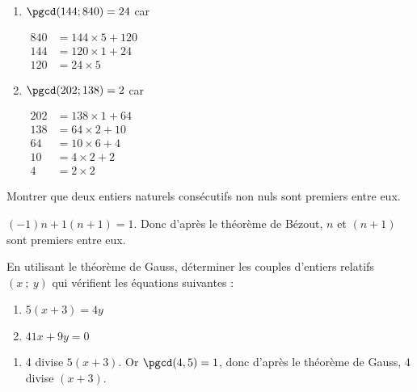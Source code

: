 \begin{colonne*exercice}
\begin{corrige}
\begin{enumerate}
  \item $\pgcd(144;840)=24$ car
    
    $\begin{aligned}
      840&=144\times5+120\\
      144&=120\times1+24\\
      120&=24\times5\end{aligned}$\medskip
    
    
    
  \item $\pgcd(202;138)=2$ car

    $\begin{aligned}
      202&=138\times1+64\\
      138&=64\times2+10\\
      64&=10\times6+4\\
      10&=4\times2+2\\
      4&=2\times2\end{aligned}$
    

    
  \end{enumerate}
\end{corrige}

\begin{exercice*}
  Montrer que deux entiers naturels consécutifs non nuls sont premiers
  entre eux.
\end{exercice*}
\begin{corrige}
  $(-1)n+1(n+1)=1$. Donc d'après le théorème de Bézout, $n$ et $(n+1)$
  sont premiers entre eux.
\end{corrige}

\begin{exercice*}
En utilisant le théorème de Gauss, déterminer les couples d’entiers
relatifs $(x\ ;\ y)$ qui vérifient les équations suivantes :

\vspace{-2mm}
\begin{multicols}{2}
\begin{enumerate}
\item $5(x+3)=4y$
\item $41x+9y=0$
\end{enumerate}
\end{multicols}
\end{exercice*}
\begin{corrige}
  \begin{enumerate}
  \item 4 divise $5(x+3)$. Or $\pgcd(4,5)=1$, donc d'après le théorème
    de Gauss, 4 divise $(x+3)$.


\end{enumerate}
\end{corrige}
\end{colonne*exercice}
